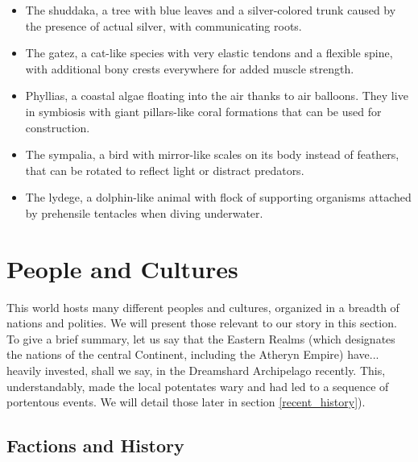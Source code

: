 \begin{itemize}
    \item The shuddaka, a tree with blue leaves and a silver-colored trunk caused by the presence of actual silver, with communicating roots.
    \item The gatez, a cat-like species with very elastic tendons and a flexible spine, with additional bony crests everywhere for added muscle strength.
    \item Phyllias, a coastal algae floating into the air thanks to air balloons. They live in symbiosis with giant pillars-like coral formations that can be used for construction.
    \item The sympalia, a bird with mirror-like scales on its body instead of feathers, that can be rotated to reflect light or distract predators.
    \item The lydege, a dolphin-like animal with flock of supporting organisms attached by prehensile tentacles when diving underwater.
\end{itemize}


 


\section{People and Cultures}

This world hosts many different peoples and cultures, organized in a breadth of nations and polities. We will present those relevant to our story in this section. To give a brief summary, let us say that the Eastern Realms (which designates the nations of the central Continent, including the Atheryn Empire) have... heavily invested, shall we say, in the Dreamshard Archipelago recently. This, understandably, made the local potentates wary and had led to a sequence of portentous events. We will detail those later in section \ref{recent_history}).



\subsection{Factions and History}


